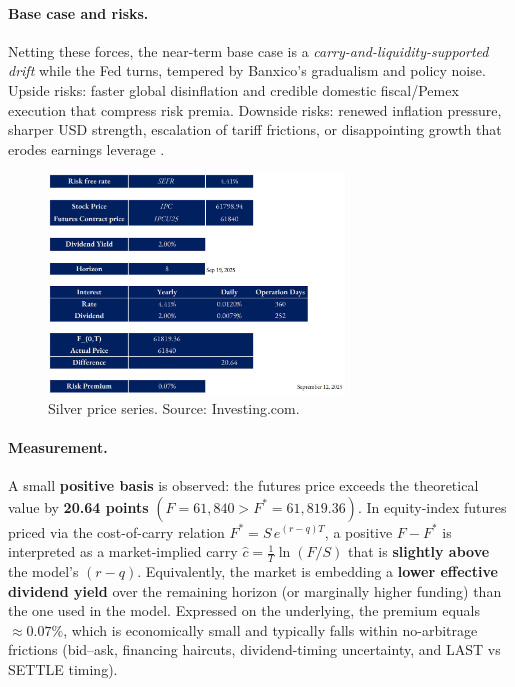 \documentclass[10pt,a4paper]{article} %
\begin{document}
\paragraph{Base case and risks.}
Netting these forces, the near-term base case is a \emph{carry-and-liquidity-supported drift} while the Fed turns, tempered by Banxico’s gradualism and policy noise. Upside risks: faster global disinflation and credible domestic fiscal/Pemex execution that compress risk premia. Downside risks: renewed inflation pressure, sharper USD strength, escalation of tariff frictions, or disappointing growth that erodes earnings leverage \citep{reuters_ipc_record_2025,bloomberg_mx_inflation_2025,reuters_budget_2025,reuters_pemex_plan_2025,reuters_tariffs_china_autos_2025}.

\begin{figure}[h]
\centering
\includegraphics[width=0.7\textwidth]{figures/ipc.png}
\caption{Silver price series. Source: Investing.com.}
\end{figure}

\paragraph{Measurement.} A small \textbf{positive basis} is observed: the futures price exceeds the theoretical value by \textbf{20.64 points} $(F=61{,}840 > F^{*}=61{,}819.36)$. In equity-index futures priced via the cost-of-carry relation $F^{*}=S\,e^{(r-q)T}$, a positive $F-F^{*}$ is interpreted as a market-implied carry $\hat{c} = \tfrac{1}{T}\ln(F/S)$ that is \textbf{slightly above} the model’s $(r-q)$. Equivalently, the market is embedding a \textbf{lower effective dividend yield} over the remaining horizon (or marginally higher funding) than the one used in the model. Expressed on the underlying, the premium equals \textbf{$\approx 0.07\%$}, which is economically small and typically falls within no-arbitrage frictions (bid–ask, financing haircuts, dividend-timing uncertainty, and LAST vs SETTLE timing).
\end{document}
